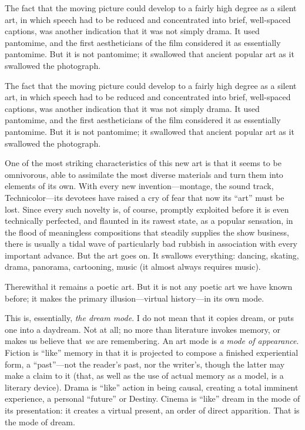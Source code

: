 \documentclass{tufte-handout}
\begin{document}

The fact that the moving picture could develop to a fairly high degree
as a silent art, in which speech had to be reduced and concen­trated into
brief, well-spaced captions, was another indication that it was not
simply drama. It used pantomime, and the first aestheticians of the film
considered it as essentially pantomime. But it is not pantomime; it
swallowed that ancient popular art as it swallowed the photograph.

The fact that the moving picture could develop to a fairly high degree
as a silent art, in which speech had to be reduced and concen­trated into
brief, well-spaced captions, was another indication that it was not
simply drama. It used pantomime, and the first aestheticians of the film
considered it as essentially pantomime. But it is not pantomime; it
swallowed that ancient popular art as it swallowed the photograph.

One of the most striking characteristics of this new art is that it
seems to be omnivorous, able to assimilate the most diverse materials
and turn them into elements of its own. With every new
invention---mon­tage, the sound track, Technicolor---its devotees have
raised a cry of fear that now its ``art'' must be lost. Since every such
novelty is, of course, promptly exploited before it is even technically
perfected, and flaunted in its rawest state, as a popular sensation, in
the flood of meaningless compositions that steadily supplies the show
business, there is usually a tidal wave of particularly bad rubbish in
association with every im­portant advance. But the art goes on. It
swallows everything: dancing, skating, drama, panorama, cartooning,
music (it almost always requires music).

Therewithal it remains a poetic art. But it is not any poetic art we
have known before; it makes the primary illusion---virtual history---in
its own mode.

This is, essentially, \emph{the dream mode}. I do not mean that it
copies dream, or puts one into a daydream. Not at all; no more than
literature invokes memory, or makes us believe that \emph{we} are
remembering. An art mode is \emph{a} \emph{mode of appearance}. Fiction
is ``like'' memory in that it is projected to compose a finished
experiential form, a ``past''---not the reader's past, nor the writer's,
though the latter may make a claim to it (that, as well as the use of
actual memory as a model, is a literary device). Drama is ``like''
action in being causal, creating a total immi­nent experience, a personal
``future'' or Destiny. Cinema is ``like'' dream in the mode of its
presentation: it creates a virtual present, an order of direct
apparition. That is the mode of dream.
\end{document}
